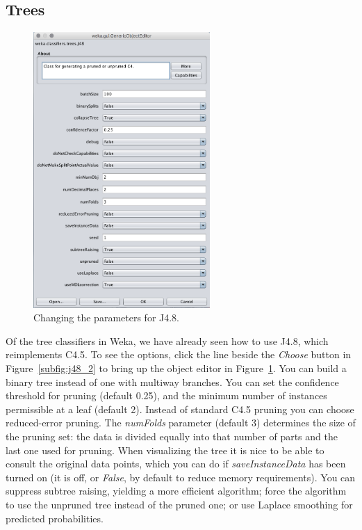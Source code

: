\subsection{Trees}

\begin{figure}[!th]
\centering
\includegraphics[width=0.6\textwidth]{images/B2_20.png}
\caption{Changing the parameters for J4.8.}
\label{fig:goe_j48}
\end{figure}

Of the tree classifiers in Weka, we have already seen how to use J4.8,
which reimplements C4.5. To see the options, click the line beside the
\textit{Choose} button in Figure~\ref{subfig:j48_2} to bring up the
object editor in Figure~\ref{fig:goe_j48}. You can build a binary tree
instead of one with multiway branches. You can set the confidence
threshold for pruning (default 0.25), and the minimum number of
instances permissible at a leaf (default 2). Instead of standard C4.5
pruning you can choose reduced-error pruning. The \textit{numFolds}
parameter (default 3) determines the size of the pruning set: the data
is divided equally into that number of parts and the last one used for
pruning. When visualizing the tree it is nice to be able to consult
the original data points, which you can do if
\textit{saveInstanceData} has been turned on (it is off, or
\textit{False}, by default to reduce memory requirements). You can
suppress subtree raising, yielding a more efficient algorithm; force
the algorithm to use the unpruned tree instead of the pruned one; or
use Laplace smoothing for predicted probabilities.

